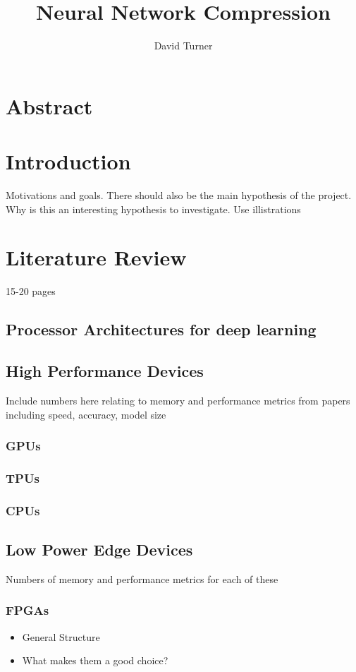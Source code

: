 \documentclass[12pt]{article}
\title{Neural Network Compression}
\author{David Turner}
\begin{document}
\begin{titlepage}
\maketitle
\end{titlepage}

\section{Abstract}

\section{Introduction}
Motivations and goals. There should also be the main hypothesis of the project. Why is this an interesting hypothesis to investigate. Use illistrations

\section{Literature Review}
15-20 pages
\subsection{Processor Architectures for deep learning}

\subsection{High Performance Devices}
Include numbers here relating to memory and performance metrics from papers including speed, accuracy, model size
\subsubsection{GPUs}
\subsubsection{TPUs}
\subsubsection{CPUs}

\subsection{Low Power Edge Devices}
Numbers of memory and performance metrics for each of these
\subsubsection{FPGAs}
\begin{itemize}
\item
General Structure
\item
What makes them a good choice?
\end{itemize}
\end{document}
